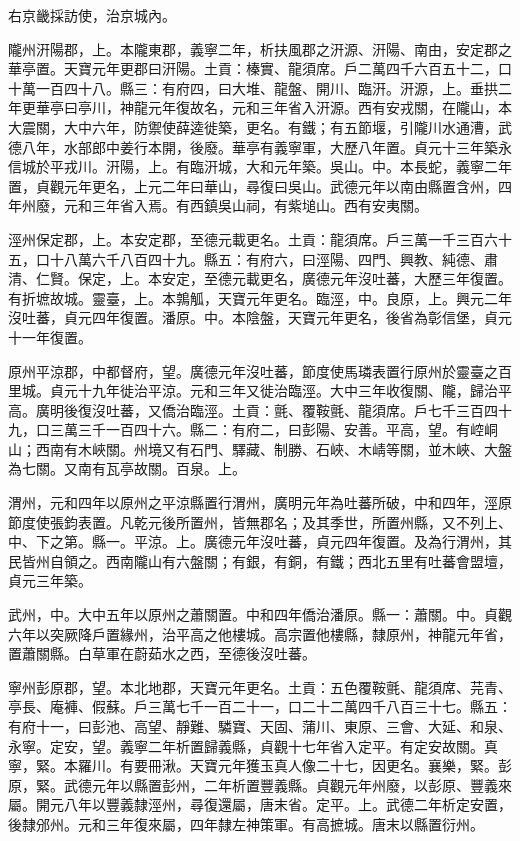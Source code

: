 \begin{pinyinscope}
 右京畿採訪使，治京城內。



 隴州汧陽郡，上。本隴東郡，義寧二年，析扶風郡之汧源、汧陽、南由，安定郡之華亭置。天寶元年更郡曰汧陽。土貢：榛實、龍須席。戶二萬四千六百五十二，口十萬一百四十八。縣三：有府四，曰大堆、龍盤、開川、臨汧。汧源，上。垂拱二年更華亭曰亭川，神龍元年復故名，元和三年省入汧源。西有安戎關，在隴山，本大震關，大中六年，防禦使薛逵徙築，更名。有鐵；有五節堰，引隴川水通漕，武德八年，水部郎中姜行本開，後廢。華亭有義寧軍，大歷八年置。貞元十三年築永信城於平戎川。汧陽，上。有臨汧城，大和元年築。吳山。中。本長蛇，義寧二年置，貞觀元年更名，上元二年曰華山，尋復曰吳山。武德元年以南由縣置含州，四年州廢，元和三年省入焉。有西鎮吳山祠，有紫塠山。西有安夷關。



 涇州保定郡，上。本安定郡，至德元載更名。土貢：龍須席。戶三萬一千三百六十五，口十八萬六千八百四十九。縣五：有府六，曰涇陽、四門、興教、純德、肅清、仁賢。保定，上。本安定，至德元載更名，廣德元年沒吐蕃，大歷三年復置。有折墌故城。靈臺，上。本鶉觚，天寶元年更名。臨涇，中。良原，上。興元二年沒吐蕃，貞元四年復置。潘原。中。本陰盤，天寶元年更名，後省為彰信堡，貞元十一年復置。



 原州平涼郡，中都督府，望。廣德元年沒吐蕃，節度使馬璘表置行原州於靈臺之百里城。貞元十九年徙治平涼。元和三年又徙治臨涇。大中三年收復關、隴，歸治平高。廣明後復沒吐蕃，又僑治臨涇。土貢：氈、覆鞍氈、龍須席。戶七千三百四十九，口三萬三千一百四十六。縣二：有府二，曰彭陽、安善。平高，望。有崆峒山；西南有木峽關。州境又有石門、驛藏、制勝、石峽、木崝等關，並木峽、大盤為七關。又南有瓦亭故關。百泉。上。



 渭州，元和四年以原州之平涼縣置行渭州，廣明元年為吐蕃所破，中和四年，涇原節度使張鈞表置。凡乾元後所置州，皆無郡名；及其季世，所置州縣，又不列上、中、下之第。縣一。平涼。上。廣德元年沒吐蕃，貞元四年復置。及為行渭州，其民皆州自領之。西南隴山有六盤關；有銀，有銅，有鐵；西北五里有吐蕃會盟壇，貞元三年築。



 武州，中。大中五年以原州之蕭關置。中和四年僑治潘原。縣一：蕭關。中。貞觀六年以突厥降戶置緣州，治平高之他樓城。高宗置他樓縣，隸原州，神龍元年省，置蕭關縣。白草軍在蔚茹水之西，至德後沒吐蕃。



 寧州彭原郡，望。本北地郡，天寶元年更名。土貢：五色覆鞍氈、龍須席、芫青、亭長、庵褲、假蘇。戶三萬七千一百二十一，口二十二萬四千八百三十七。縣五：有府十一，曰彭池、高望、靜難、驎寶、天固、蒲川、東原、三會、大延、和泉、永寧。定安，望。義寧二年析置歸義縣，貞觀十七年省入定平。有定安故關。真寧，緊。本羅川。有要冊湫。天寶元年獲玉真人像二十七，因更名。襄樂，緊。彭原，緊。武德元年以縣置彭州，二年析置豐義縣。貞觀元年州廢，以彭原、豐義來屬。開元八年以豐義隸涇州，尋復還屬，唐末省。定平。上。武德二年析定安置，後隸邠州。元和三年復來屬，四年隸左神策軍。有高摭城。唐末以縣置衍州。




\end{pinyinscope}
